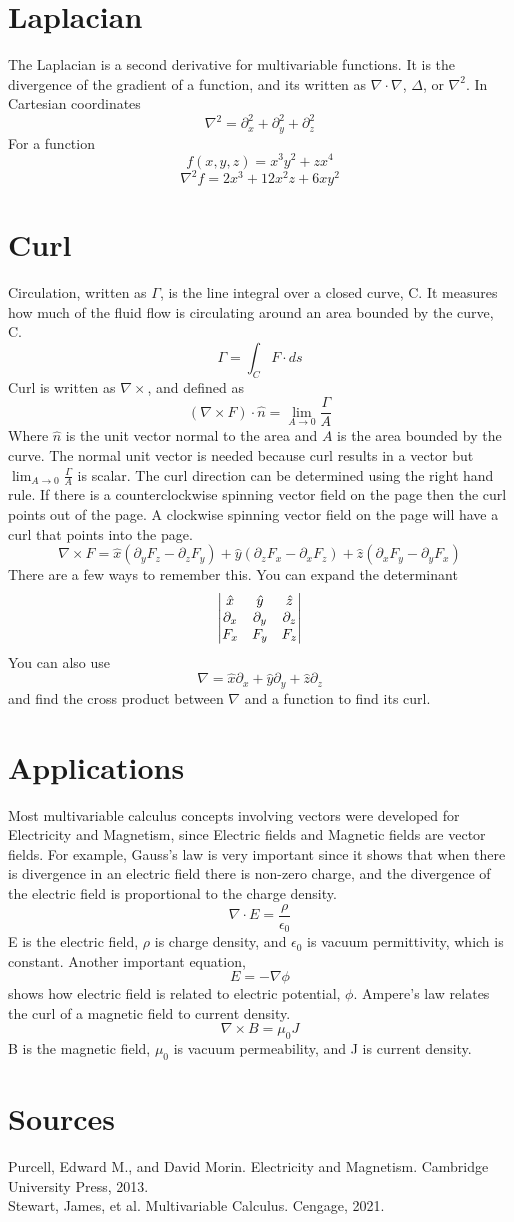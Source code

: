 \documentclass{article}
\begin{document}
\section{Laplacian}
    The Laplacian is a second derivative for multivariable functions. It is the divergence of the gradient of a function, and its written as $\nabla \cdot \nabla$, $\Delta$, or $\nabla^2$. In Cartesian coordinates
    $$\nabla^2 = \partial_x^2 + \partial_y^2 + \partial_z^2$$
    For a function 
    $$f(x,y,z) = x^3y^2 + zx^4$$
    $$\nabla^2 f = 2 x^3 + 12 x^2 z + 6 x y^2$$
\section{Curl}
    Circulation, written as $\Gamma$, is the line integral over a closed curve, C. It measures how much of the fluid flow is circulating around an area bounded by the curve, C. 
    $$\Gamma = \int_C F \cdot ds$$
    Curl is written as $\nabla \times$, and defined as
    $$(\nabla \times F) \cdot \hat{n} = \lim_{A \to 0} \frac{\Gamma}{A} $$
    Where $\hat{n}$ is the unit vector normal to the area and $A$ is the area bounded by the curve. The normal unit vector is needed because curl results in a vector but $\lim_{A \to 0} \frac{\Gamma}{A}$ is scalar. The curl direction can be determined using the right hand rule. If there is a counterclockwise spinning vector field on the page then the curl points out of the page. A clockwise spinning vector field on the page will have a curl that points into the page. 
    $$\nabla \times F = \hat{x}(\partial_y F_z - \partial_z F_y) + \hat{y}(\partial_z F_x - \partial_x F_z) + \hat{z}(\partial_x F_y - \partial_y F_x)$$ 
    There are a few ways to remember this. You can expand the determinant 
    $$\mdet{\hat{x} & \hat{y} & \hat{z}\\ \partial_x & \partial_y & \partial_z \\ F_x & F_y & F_z}$$
    You can also use 
    $$\nabla = \hat{x}\partial_x + \hat{y}\partial_y + \hat{z}\partial_z$$
    and find the cross product between $\nabla$ and a function to find its curl. 
\section{Applications}
    Most multivariable calculus concepts involving vectors were developed for Electricity and Magnetism, since Electric fields and Magnetic fields are vector fields. For example, Gauss's law is very important since it shows that when there is divergence in an electric field there is non-zero charge, and the divergence of the electric field is proportional to the charge density. 
    $$\nabla \cdot E = \frac{\rho}{\epsilon_0}$$
    E is the electric field, $\rho$ is charge density, and $\epsilon_0$ is vacuum permittivity, which is constant. 
    Another important equation, 
    $$E = -\nabla \phi$$
    shows how electric field is related to electric potential, $\phi$.
    Ampere's law relates the curl of a magnetic field to current density. 
    $$\nabla \times B = \mu_0 J$$
    B is the magnetic field, $\mu_0$ is vacuum permeability, and J is current density. 
\section{Sources}
    Purcell, Edward M., and David Morin. Electricity and Magnetism. Cambridge University Press, 2013. 
    \\
    Stewart, James, et al. Multivariable Calculus. Cengage, 2021. 
\end{document}
